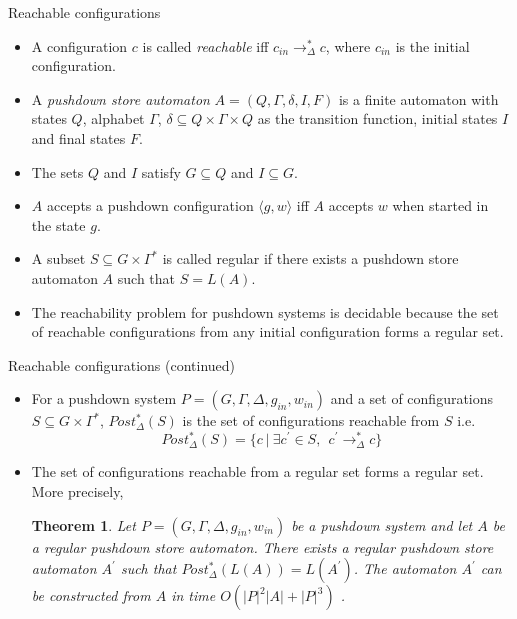 \documentclass[10pt,notheorems]{beamer}
\theoremstyle{plain} %
\newtheorem{theorem}{Theorem}
\begin{document}
\begin{frame}{Reachable configurations}
   \begin{itemize}
    \item A configuration $c$ is called \textit{reachable} iff $c_{in}\rightarrow_{\Delta}^* c$, where 
    $c_{in}$ is the initial configuration.
    \item A \textit{pushdown store automaton} $A=(Q,\Gamma,\delta, I,F)$ is a finite automaton with states 
    $Q$, alphabet $\Gamma$, $\delta\subseteq Q\times\Gamma\times Q$ as the transition function, initial states $I$ and
    final states $F$.
    \item The sets $Q$ and $I$ satisfy $G\subseteq Q$ and $I\subseteq G$.
    \item $A$ accepts a pushdown configuration $\langle g,w\rangle$ iff $A$ accepts $w$ when started in the state $g$.   
    \item A subset $S\subseteq G\times \Gamma^*$ is called regular if there exists a pushdown store automaton 
    $A$ such that $S=L(A)$.
    \item The reachability problem for pushdown systems is decidable because the set of reachable configurations
    from any initial configuration forms a regular set.  
   \end{itemize} 
\end{frame}
\begin{frame}{Reachable configurations (continued)}
    \begin{itemize}
        \item For a pushdown system $P= (G,\Gamma,\Delta,g_{in},w_{in})$ and a set of configurations 
        $S\subseteq G\times \Gamma^*$, $Post_{\Delta}^*(S)$ is the set of configurations reachable from $S$ i.e.
        \[Post_{\Delta}^*(S)=\{c\:|\:\exists c^{\prime}\in S,\:\:c^{\prime}\rightarrow_{\Delta}^*c\}\]
        \item The set of configurations reachable from a regular set forms a regular set. More precisely,
        \begin{theorem}\label{thm1}
            Let $P=(G,\Gamma,\Delta, g_{in},w_{in})$ be a pushdown system and let $A$ be a regular pushdown store
            automaton. There exists a regular pushdown store automaton $A^{\prime}$ such that $Post_{\Delta}^*(L(A))=L(A^{\prime})$.
            The automaton $A^{\prime}$ can be constructed from $A$ in time $O(|P|^2|A|+|P|^3)$ \cite{schwoon2002model}.
        \end{theorem}
    \end{itemize}
\end{frame}
\end{document}
